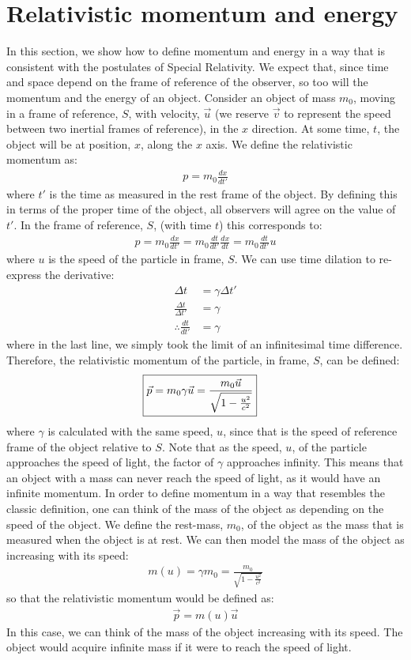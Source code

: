 \section{Relativistic momentum and energy}
In this section, we show how to define momentum and energy in a way that is consistent with the postulates of Special Relativity. We expect that, since time and space depend on the frame of reference of the observer, so too will the momentum and the energy of an object. Consider an object of mass $m_0$, moving in a frame of reference, $S$, with velocity, $\vec u$ (we reserve $\vec v$ to represent the speed between two inertial frames of reference), in the $x$ direction. At some time, $t$, the object will be at position, $x$, along the $x$ axis. We define the relativistic momentum as:
\begin{align*}
p = m_0\frac{dx}{dt'}
\end{align*}
where $t'$ is the time as measured in the rest frame of the object. By defining this in terms of the proper time of the object, all observers will agree on the value of $t'$. In the frame of reference, $S$, (with time $t$) this corresponds to:
\begin{align*}
p = m_0\frac{dx}{dt'}=m_0\frac{dt}{dt'}\frac{dx}{dt}=m_0\frac{dt}{dt'}u
\end{align*}
where $u$ is the speed of the particle in frame, $S$. We can use time dilation to re-express the derivative:
\begin{align*}
\Delta t &= \gamma \Delta t'\\
\frac{\Delta t}{\Delta t'}&=\gamma\\
\therefore \frac{dt}{dt'}&=\gamma
\end{align*}
where in the last line, we simply took the limit of an infinitesimal time difference. Therefore, the relativistic momentum of the particle, in frame, $S$, can be defined:
\begin{align*}
\Aboxed{\vec p = m_0\gamma\vec u =  \frac{m_0\vec u}{\sqrt{1-\frac{u^2}{c^2}}} }
\end{align*}
where $\gamma$ is calculated with the same speed, $u$, since that is the speed of reference frame of the object relative to $S$. Note that as the speed, $u$, of the particle approaches the speed of light, the factor of $\gamma$ approaches infinity. This means that an object with a mass can never reach the speed of light, as it would have an infinite momentum. In order to define momentum in a way that resembles the classic definition, one can think of the mass of the object as depending on the speed of the object. We define the rest-mass, $m_0$, of the object as the mass that is measured when the object is at rest. We can then model the mass of the object as increasing with its speed:
\begin{align*}
m(u) = \gamma m_0 = \frac{m_0}{\sqrt{1-\frac{u^2}{c^2}}}
\end{align*}
so that the relativistic momentum would be defined as:
\begin{align*}
\vec p = m(u)\vec u
\end{align*}
In this case, we can think of the mass of the object increasing with its speed. The object would acquire infinite mass if it were to reach the speed of light.

